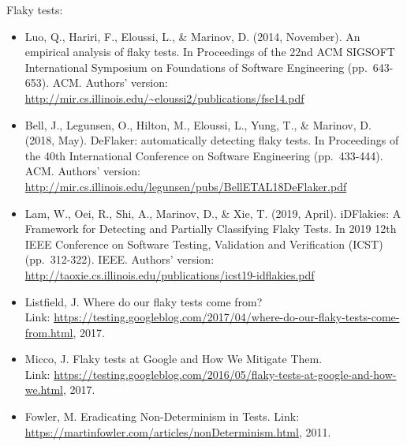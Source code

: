 Flaky tests:

\begin{itemize}
\tightlist
\item
  Luo, Q., Hariri, F., Eloussi, L., \& Marinov, D. (2014, November). An
  empirical analysis of flaky tests. In Proceedings of the 22nd ACM
  SIGSOFT International Symposium on Foundations of Software Engineering
  (pp.~643-653). ACM. Authors' version:
  \url{http://mir.cs.illinois.edu/~eloussi2/publications/fse14.pdf}
\item
  Bell, J., Legunsen, O., Hilton, M., Eloussi, L., Yung, T., \& Marinov,
  D. (2018, May). DeFlaker: automatically detecting flaky tests. In
  Proceedings of the 40th International Conference on Software
  Engineering (pp.~433-444). ACM. Authors' version:
  \url{http://mir.cs.illinois.edu/legunsen/pubs/BellETAL18DeFlaker.pdf}
\item
  Lam, W., Oei, R., Shi, A., Marinov, D., \& Xie, T. (2019, April).
  iDFlakies: A Framework for Detecting and Partially Classifying Flaky
  Tests. In 2019 12th IEEE Conference on Software Testing, Validation
  and Verification (ICST) (pp.~312-322). IEEE. Authors' version:
  \url{http://taoxie.cs.illinois.edu/publications/icst19-idflakies.pdf}
\item
  Listfield, J. Where do our flaky tests come from?\\
  Link:
  \url{https://testing.googleblog.com/2017/04/where-do-our-flaky-tests-come-from.html},
  2017.
\item
  Micco, J. Flaky tests at Google and How We Mitigate Them.\\
  Link:
  \url{https://testing.googleblog.com/2016/05/flaky-tests-at-google-and-how-we.html},
  2017.
\item
  Fowler, M. Eradicating Non-Determinism in Tests. Link:
  \url{https://martinfowler.com/articles/nonDeterminism.html}, 2011.
\end{itemize}
